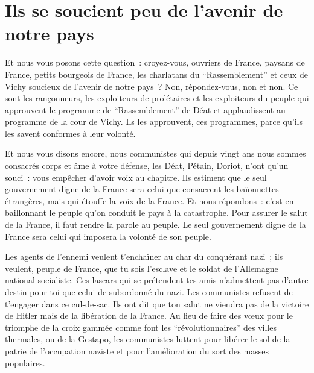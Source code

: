 \documentclass[french,twoside]{book} %
\begin{document}
\section[Ils se soucient peu de l’avenir de notre pays]{Ils se soucient peu de l’avenir de notre pays}
\noindent Et nous vous posons cette question : croyez-vous, ouvriers de France, paysans de France, petits bourgeois de France, les charlatans du “Rassemblement” et ceux de Vichy soucieux de l’avenir de notre pays ? Non, répondez-vous, non et non. Ce sont les rançonneurs, les exploiteurs de prolétaires et les exploiteurs du peuple qui approuvent le programme de “Rassemblement” de Déat et applaudissent au programme de la cour de Vichy. Ils les approuvent, ces programmes, parce qu’ils les savent conformes à leur volonté.\par
Et nous vous disons encore, nous communistes qui depuis vingt ans nous sommes consacrés corps et âme à votre défense, les Déat, Pétain, Doriot, n’ont qu’un souci : vous empêcher d’avoir voix au chapitre. Ils estiment que le seul gouvernement digne de la France sera celui que consacrent les baïonnettes étrangères, mais qui étouffe la voix de la France. Et nous répondons : c’est en baillonnant le peuple qu’on conduit le pays à la catastrophe. Pour assurer le salut de la France, il faut rendre la parole au peuple. Le seul gouvernement digne de la France sera celui qui imposera la volonté de son peuple.\par
Les agents de l’ennemi veulent t’enchaîner au char du conquérant nazi ; ils veulent, peuple de France, que tu sois l’esclave et le soldat de l’Allemagne national-socialiste. Ces lascars qui se prétendent tes amis n’admettent pas d’autre destin pour toi que celui de subordonné du nazi. Les communistes refusent de t’engager dans ce cul-de-sac. Ils ont dit que ton salut ne viendra pas de la victoire de Hitler mais de la libération de la France. Au lieu de faire des vœux pour le triomphe de la croix gammée comme font les “révolutionnaires” des villes thermales, ou de la Gestapo, les communistes luttent pour libérer le sol de la patrie de l’occupation naziste et pour l’amélioration du sort des masses populaires.
\end{document}
